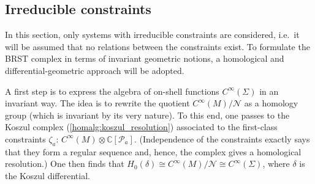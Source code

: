\subsection{Irreducible constraints}\label{section:irreducible_constraints}

    In this section, only systems with irreducible constraints are considered, i.e.~it will be assumed that no relations between the constraints exist. To formulate the BRST complex in terms of invariant geometric notions, a homological and differential-geometric approach will be adopted.

    A first step is to express the algebra of on-shell functions $C^\infty(\Sigma)$ in an invariant way. The idea is to rewrite the quotient $C^\infty(M)/\mathcal{N}$ as a homology group (which is invariant by its very nature). To this end, one passes to the Koszul complex (\cref{homalg:koszul_resolution}) associated to the first-class constraints $\zeta_a$: $C^\infty(M)\otimes\mathbb{C}[\mathcal{P}_a]$. (Independence of the constraints exactly says that they form a regular sequence and, hence, the complex gives a homological resolution.) One then finds that $H_0(\delta)\cong C^\infty(M)/\mathcal{N}\cong C^\infty(\Sigma)$, where $\delta$ is the Koszul differential.

